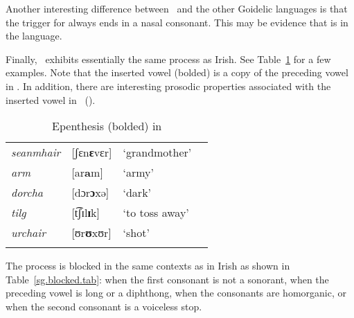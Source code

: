 \documentclass[output=paper,colorlinks,citecolor=brown]{langscibook}
\begin{document}
Another  interesting difference between \sg\ and the other Goidelic languages is that the trigger for   always ends in a nasal consonant. This may be evidence that  is  in the language.

Finally, \sg\ exhibits essentially the same  process as Irish. See Table~\ref{sg.epenthesis.tab} for a few examples. Note that the inserted vowel (bolded) is a copy of the preceding vowel in \sg. In addition, there are interesting prosodic properties associated with the inserted vowel in \sg\ (\cite{bosch.dejong, bosch.syl}). 


\begin{table}
\caption{Epenthesis (bolded) in \sg}
\label{sg.epenthesis.tab}
\begin{tabular}[t]{>{\itshape}llll}
\lsptoprule
seanmhair & [ʃɛn\textbf{ɛ}vɛr]  & `grandmother'   \\
arm       & [ar\textbf{a}m]     & `army'          \\
dorcha    & [dɔr\textbf{ɔ}xə]   & `dark'          \\
tilg      & [t͡ʃɪl\textbf{ɪ}k]   & `to toss away'  \\
urchair   & [ʊr\textbf{ʊ}xʊr]   & `shot'          \\
\lspbottomrule
\end{tabular}
\end{table}

The process is blocked in the same contexts as in Irish as shown in Table~\ref{sg.blocked.tab}: when the first consonant is not a sonorant, when the preceding vowel is long or a diphthong, when the consonants are homorganic, or when the second consonant is a voiceless stop.
\end{document}

